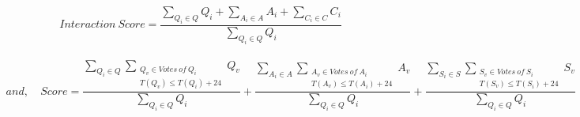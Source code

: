 \begin{equation}
\begin{split}
Interaction\ Score = \dfrac{\sum_{Q_i\in Q}Q_i+ \sum_{A_i\in A}A_i+\sum_{C_i\in C}C_i}{\sum_{Q_i\in Q}Q_i}
\end{split}
\end{equation}

\begin{equation}
\begin{split}
and,\ & Score = \dfrac{\sum_{Q_i\in Q}\sum_{\substack{Q_v\in Votes\: of\: Q_i\\T(Q_v) \leq T(Q_i)+24}}Q_v}{\sum_{Q_i\in Q}Q_i}+  \dfrac{\sum_{A_i\in A}\sum_{\substack{A_v\in Votes\: of\: A_i\\T(A_v) \leq T(A_i)+24}}A_v}{\sum_{Q_i\in Q}Q_i}+\dfrac{\sum_{S_i\in S}\sum_{\substack{S_v\in Votes\: of\: S_i\\T(S_v) \leq T(S_i)+24}}S_v}{\sum_{Q_i\in Q}Q_i} 
\end{split}
\end{equation}




